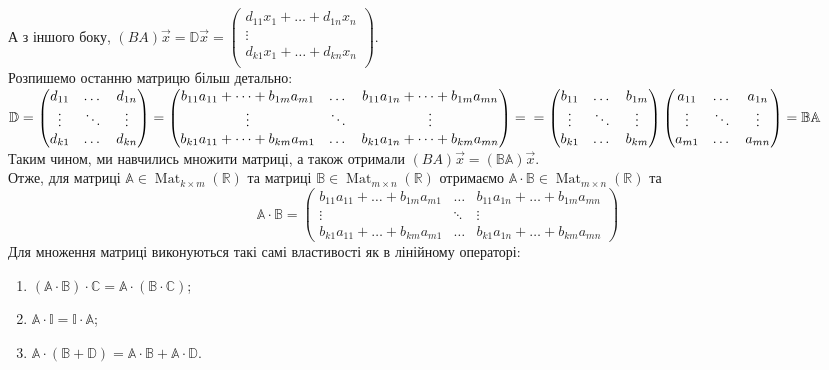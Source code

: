 \documentclass[a4paper, 10pt]{article}
\theoremstyle{theoremdd}
\DeclareMathOperator{\Mat}{Mat}
\begin{document}
	А з іншого боку, $(BA)\vec{x} = \mathbb{D}\vec{x} =
	\begin{pmatrix}
	d_{11} x_1 + \dots + d_{1n} x_n \\
	\vdots \\
	d_{k1} x_1 + \dots + d_{kn} x_n \\
	\end{pmatrix}$.\\
	Розпишемо останню матрицю більш детально:\\
	$\mathbb{D} = \begin{pmatrix}
	d_{11} & \dots & d_{1n}\\
	\vdots & \ddots & \vdots \\
	d_{k1} & \dots & d_{kn}
	\end{pmatrix} =
	\begin{pmatrix}
	b_{11}a_{11}+\dots+b_{1m}a_{m1} & \dots & b_{11}a_{1n}+\dots+b_{1m}a_{mn} \\
	\vdots & \ddots & \vdots \\
	b_{k1}a_{11} + \dots + b_{km}a_{m1} & \dots & b_{k1}a_{1n} + \dots + b_{km}a_{mn} 
	\end{pmatrix} = \\ =
	\begin{pmatrix}
	b_{11} & \dots & b_{1m}\\
	\vdots & \ddots & \vdots \\
	b_{k1} & \dots & b_{km}
	\end{pmatrix}
	\begin{pmatrix}
	a_{11} & \dots & a_{1n}\\
	\vdots & \ddots & \vdots \\
	a_{m1} & \dots & a_{mn}
	\end{pmatrix} = \mathbb{B} \mathbb{A}
	$\\
	Таким чином, ми навчились множити матриці, а також отримали $(BA)\vec{x} = (\mathbb{B} \mathbb{A})\vec{x}$.
	\bigskip \\
	Отже, для матриці $\mathbb{A} \in \Mat_{k \times m}(\mathbb{R})$ та матриці $\mathbb{B} \in \Mat_{m \times n}(\mathbb{R})$ отримаємо $\mathbb{A} \cdot \mathbb{B} \in \Mat_{m \times n}(\mathbb{R})$ та
	$$ \mathbb{A} \cdot \mathbb{B} = \begin{pmatrix}
	b_{11}a_{11}+\dots+b_{1m}a_{m1} & \dots & b_{11}a_{1n}+\dots+b_{1m}a_{mn} \\
	\vdots & \ddots & \vdots \\
	b_{k1}a_{11} + \dots + b_{km}a_{m1} & \dots & b_{k1}a_{1n} + \dots + b_{km}a_{mn} 
	\end{pmatrix}$$
	Для множення матриці виконуються такі самі властивості як в лінійному операторі:
	\begin{enumerate}[nosep, label={\arabic*)}, wide=0pt]
	\item $(\mathbb{A} \cdot \mathbb{B}) \cdot \mathbb{C} = \mathbb{A} \cdot (\mathbb{B} \cdot \mathbb{C})$;
	\item $\mathbb{A} \cdot \mathbb{I} = \mathbb{I} \cdot \mathbb{A}$;
	\item $\mathbb{A} \cdot (\mathbb{B} + \mathbb{D}) = \mathbb{A} \cdot \mathbb{B} + \mathbb{A} \cdot \mathbb{D}$.
	\end{enumerate}
	
\end{document}
